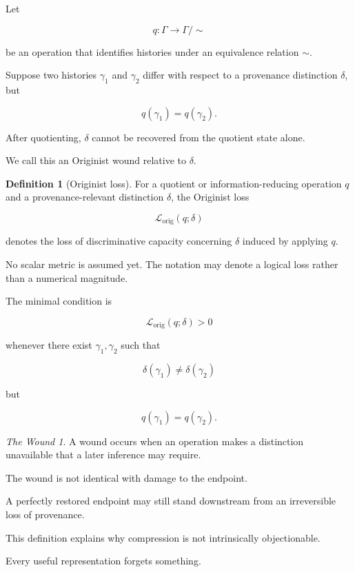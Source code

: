 \documentclass[
  11pt,
  a4paper,
  DIV=12,
  BCOR=0mm,
  parskip=half-
]{scrartcl}
\newcommand{\lossorig}{%
  \mathscr L_{\mathrm{orig}}%
}
\theoremstyle{definition}
\newtheorem{definition}{Definition}[section]
\theoremstyle{plain}
\theoremstyle{remark}
\newtheorem*{wounded}{The Wound}
\begin{document}
Let

\[
  q:\Gamma\longrightarrow\Gamma/{\sim}
\]

be an operation that identifies histories under an equivalence relation
\(\sim\).

Suppose two histories \(\gamma_1\) and \(\gamma_2\) differ with respect to a
provenance distinction \(\delta\), but

\[
  q(\gamma_1)=q(\gamma_2).
\]

After quotienting, \(\delta\) cannot be recovered from the quotient state
alone.

We call this an Originist wound relative to \(\delta\).

\begin{definition}[Originist loss]
\label{def:originist-loss}
For a quotient or information-reducing operation \(q\) and a
provenance-relevant distinction \(\delta\), the Originist loss

\[
  \lossorig(q;\delta)
\]

denotes the loss of discriminative capacity concerning \(\delta\) induced by
applying \(q\).
\end{definition}

No scalar metric is assumed yet. The notation may denote a logical loss
rather than a numerical magnitude.

The minimal condition is

\[
  \lossorig(q;\delta)>0
\]

whenever there exist \(\gamma_1,\gamma_2\) such that

\[
  \delta(\gamma_1)\neq\delta(\gamma_2)
\]

but

\[
  q(\gamma_1)=q(\gamma_2).
\]

\begin{woundbox}
\begin{wounded}
A wound occurs when an operation makes a distinction unavailable that a later
inference may require.

The wound is not identical with damage to the endpoint.

A perfectly restored endpoint may still stand downstream from an irreversible
loss of provenance.
\end{wounded}
\end{woundbox}

This definition explains why compression is not intrinsically objectionable.

Every useful representation forgets something.
\end{document}
